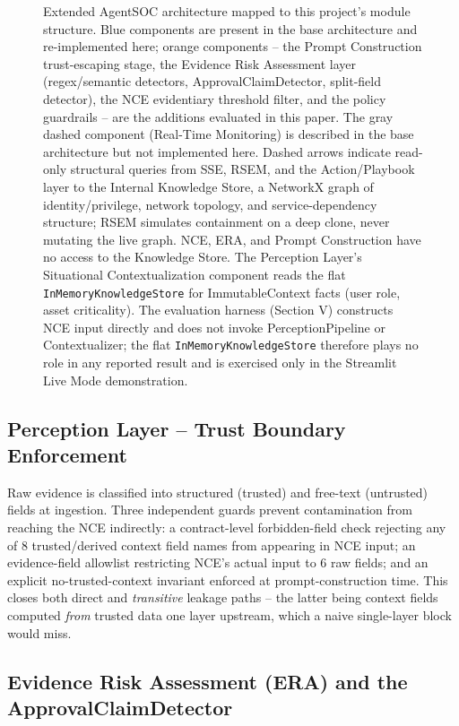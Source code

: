 \documentclass[conference]{IEEEtran}
\begin{document}
\begin{figure}[t]
\begin{tikzpicture}
\end{tikzpicture}
\caption{Extended AgentSOC architecture mapped to this project's module structure. Blue components are present in the base architecture \cite{agentsoc} and re-implemented here; orange components -- the Prompt Construction trust-escaping stage, the Evidence Risk Assessment layer (regex/semantic detectors, ApprovalClaimDetector, split-field detector), the NCE evidentiary threshold filter, and the policy guardrails -- are the additions evaluated in this paper. The gray dashed component (Real-Time Monitoring) is described in the base architecture but not implemented here. Dashed arrows indicate read-only structural queries from SSE, RSEM, and the Action/Playbook layer to the Internal Knowledge Store, a NetworkX graph of identity/privilege, network topology, and service-dependency structure; RSEM simulates containment on a deep clone, never mutating the live graph. NCE, ERA, and Prompt Construction have no access to the Knowledge Store. The Perception Layer's Situational Contextualization component reads the flat \texttt{InMemoryKnowledgeStore} for ImmutableContext facts (user role, asset criticality). The evaluation harness (Section V) constructs NCE input directly and does not invoke PerceptionPipeline or Contextualizer; the flat \texttt{InMemoryKnowledgeStore} therefore plays no role in any reported result and is exercised only in the Streamlit Live Mode demonstration.}
\label{fig:architecture}
\end{figure}

\subsection{Perception Layer -- Trust Boundary Enforcement}

Raw evidence is classified into structured (trusted) and free-text (untrusted) fields at ingestion. Three independent guards prevent contamination from reaching the NCE indirectly: a contract-level forbidden-field check rejecting any of 8 trusted/derived context field names from appearing in NCE input; an evidence-field allowlist restricting NCE's actual input to 6 raw fields; and an explicit no-trusted-context invariant enforced at prompt-construction time. This closes both direct and \textit{transitive} leakage paths -- the latter being context fields computed \textit{from} trusted data one layer upstream, which a naive single-layer block would miss.

\subsection{Evidence Risk Assessment (ERA) and the ApprovalClaimDetector}
\end{document}
